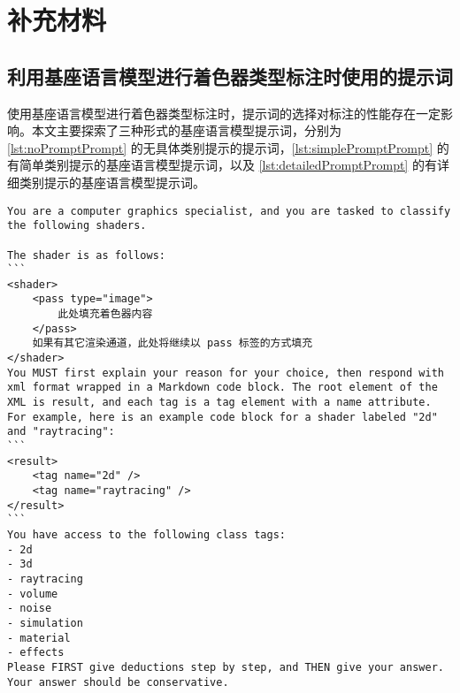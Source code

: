 
\chapter{补充材料}


\section{利用基座语言模型进行着色器类型标注时使用的提示词}
\label{sec:prompt_appendix}

使用基座语言模型进行着色器类型标注时，提示词的选择对标注的性能存在一定影响。本文主要探索了三种形式的基座语言模型提示词，分别为 \ref{lst:noPromptPrompt} 的无具体类别提示的提示词，\ref{lst:simplePromptPrompt} 的有简单类别提示的基座语言模型提示词，以及 \ref{lst:detailedPromptPrompt} 的有详细类别提示的基座语言模型提示词。


\begin{lstlisting}[style=plaintext, caption={无类别提示的基座语言模型提示词}, label=lst:noPromptPrompt]
You are a computer graphics specialist, and you are tasked to classify the following shaders.

The shader is as follows:
```
<shader>
    <pass type="image">
        此处填充着色器内容
    </pass>
    如果有其它渲染通道，此处将继续以 pass 标签的方式填充
</shader>
You MUST first explain your reason for your choice, then respond with xml format wrapped in a Markdown code block. The root element of the XML is result, and each tag is a tag element with a name attribute.
For example, here is an example code block for a shader labeled "2d" and "raytracing":
```
<result>
    <tag name="2d" />
    <tag name="raytracing" />
</result>
```
You have access to the following class tags:
- 2d
- 3d
- raytracing
- volume
- noise
- simulation
- material
- effects
Please FIRST give deductions step by step, and THEN give your answer. Your answer should be conservative.
\end{lstlisting}

